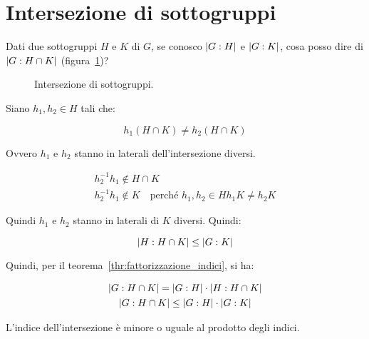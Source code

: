 \section{Intersezione di sottogruppi}

\begin{esercizio}
	Dati due sottogruppi $H$ e $K$ di $G$, se conosco $\lvert G:H \rvert$ e $\lvert G:K \rvert$, cosa posso dire di $\lvert G:H \cap K \rvert$ (figura~\ref{fig:Laterali_intersezione_di_sottogruppi})?
\end{esercizio}
\begin{figure}[tp]
	\centering
	\caption{Intersezione di sottogruppi.}
	\label{fig:Laterali_intersezione_di_sottogruppi}
\end{figure}
\begin{soluzione}
	Siano $h_1, h_2 \in H$ tali che:
	
	\begin{equation}
		h_1(H \cap K) \ne h_2(H \cap K)
	\end{equation}

	Ovvero $h_1$ e $h_2$ stanno in laterali dell'intersezione diversi.
	
	\begin{gather}
		h_2^{-1}h_1 \not\in H \cap K \\
		h_2^{-1}h_1 \not\in K \quad \text{perché } h_1, h_2 \in H
		h_1 K \ne h_2 K
	\end{gather}

	Quindi $h_1$ e $h_2$ stanno in laterali di $K$ diversi. Quindi:
	
	\begin{equation}
		\lvert H:H \cap K \rvert \le \lvert G:K \rvert
	\end{equation}

	Quindi, per il teorema~\ref{thr:fattorizzazione_indici}, si ha:
	
	\begin{gather}
		\lvert G:H \cap K \rvert = \lvert G:H \rvert \cdot \lvert H:H \cap K \rvert \\
		\lvert G:H \cap K \rvert \le \lvert G:H \rvert \cdot \lvert G:K \rvert
	\end{gather}

	L'indice dell'intersezione è minore o uguale al prodotto degli indici.
\end{soluzione}

